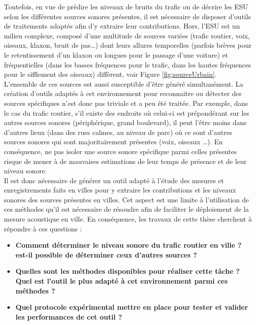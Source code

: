 Toutefois, en vue de prédire les niveaux de bruits du trafic ou de décrire les ESU selon les différentes sources sonores présentes, il est nécessaire de disposer d'outils de traitements  adaptés afin d'y extraire leur contributions. Hors, l'ESU est un milieu complexe, composé d'une multitude de sources variées (trafic routier, voix, oiseaux, klaxon, bruit de pas\dots) dont leurs allures temporelles (parfois brèves pour le retentissement d'un klaxon ou longues pour le passage d'une voiture) et fréquentielles (dans les basses fréquences pour le trafic, dans les hautes fréquences pour le sifflement des oiseaux) diffèrent, voir Figure \ref{fig:sourceUrbain}.
L'ensemble de ces sources est aussi susceptible d'être généré simultanément. La création d'outils adaptés à cet environnement pour reconnaitre ou détecter des sources spécifiques n'est donc pas triviale et a peu été traitée. Par exemple, dans le cas du trafic routier, s'il existe des endroits où celui-ci est prépondérant sur les autres sources sonores (périphérique, grand boulevard), il peut l'être moins dans d'autres lieux (dans des rues calmes, au niveau de parc) où ce sont d'autres sources sonores qui sont majoritairement présentes (voix, oiseaux \dots). En conséquence, ne pas isoler une source sonore spécifique parmi celles présentes risque de mener à de mauvaises estimations de leur temps de présence et de leur niveau sonore. \\

Il est donc nécessaire de générer un outil adapté à l'étude des mesures et enregistrements faits en villes pour y extraire les contributions et les niveaux sonores des sources présentes en villes. Cet aspect est une limite à l'utilisation de ces méthodes qu'il est nécessaire de résoudre afin de faciliter le déploiement de la mesure acoustique en ville.
En conséquence, les travaux de cette thèse cherchent à répondre à ces questions :

\begin{itemize}
\item \textbf{Comment déterminer le niveau sonore du trafic routier en ville ? est-il possible de déterminer ceux d'autres sources ?}
\item \textbf{Quelles sont les méthodes disponibles pour réaliser cette tâche ? Quel est l'outil le plus adapté à cet environnement parmi ces méthodes ?}
\item \textbf{Quel protocole expérimental mettre en place pour tester et valider les performances de cet outil ?}
\end{itemize}

